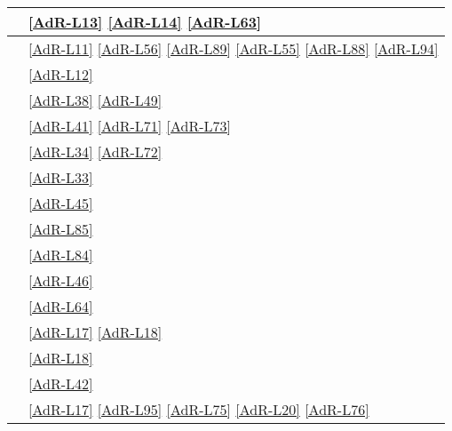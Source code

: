 \begin{longtable}{|>{\centering}P{7cm}|>{\centering}P{5cm}|}
	\hline {} & \ref{AdR-L13} \linebreak \ref{AdR-L14} \linebreak \ref{AdR-L63} \tabularnewline
	\hline {} & \ref{AdR-L11} \linebreak \ref{AdR-L56} \linebreak \ref{AdR-L89} \linebreak \ref{AdR-L55} \linebreak \ref{AdR-L88} \linebreak \ref{AdR-L94} \tabularnewline
	\hline {} & \ref{AdR-L12} \tabularnewline
	\hline {} & \ref{AdR-L38} \linebreak \ref{AdR-L49} \tabularnewline
	\hline {} & \ref{AdR-L41} \linebreak \ref{AdR-L71} \linebreak \ref{AdR-L73} \tabularnewline
	\hline {} & \ref{AdR-L34} \linebreak \ref{AdR-L72} \tabularnewline
	\hline {} & \ref{AdR-L33} \tabularnewline
	\hline {} & \ref{AdR-L45} \tabularnewline
	\hline {} & \ref{AdR-L85} \tabularnewline
	\hline {} & \ref{AdR-L84} \tabularnewline
	\hline {} & \ref{AdR-L46} \tabularnewline
	\hline {} & \ref{AdR-L64} \tabularnewline
	
	\hline {} & \ref{AdR-L17} \linebreak \ref{AdR-L18} \tabularnewline
	\hline {} & \ref{AdR-L18} \tabularnewline
	\hline {} & \ref{AdR-L42} \tabularnewline
	\hline {} & \ref{AdR-L17} \linebreak \ref{AdR-L95} \linebreak \ref{AdR-L75}  \linebreak \ref{AdR-L20}  \linebreak \ref{AdR-L76} \tabularnewline
	

\end{longtable}
